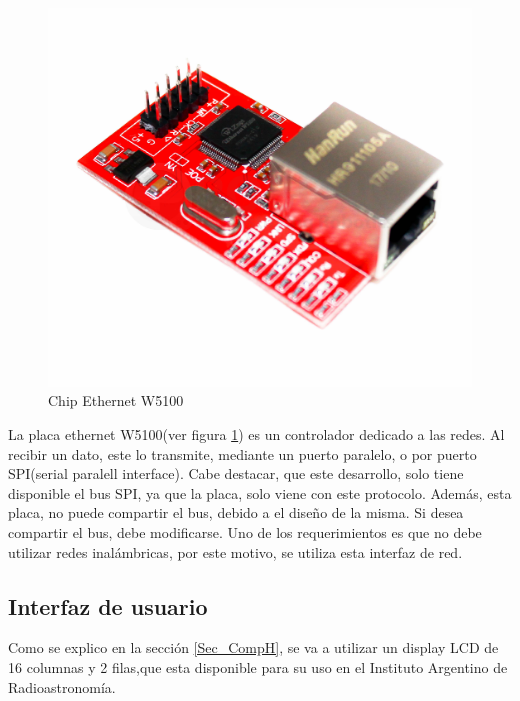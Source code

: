 \begin{figure}[ht]
	\centering	
	\includegraphics[scale=.2]{w5100}  
	\caption{Chip Ethernet W5100}		 
	\label{fig:chip_ethernet}
\end{figure}

La placa ethernet W5100(ver figura \ref{fig:chip_ethernet}) es un controlador dedicado a las redes. Al recibir un dato, este lo transmite, mediante un puerto paralelo, o por puerto SPI(serial paralell interface). Cabe destacar, que este desarrollo, solo tiene disponible el bus SPI, ya que la placa, solo viene con este protocolo. Además, esta placa, no puede compartir el bus, debido a el diseño de la misma. Si desea compartir el bus, debe modificarse. Uno de los requerimientos es que no debe utilizar redes inalámbricas, por este motivo, se utiliza esta interfaz de red. 

\subsection{Interfaz de usuario} \label{Int_u}
Como se explico en la sección \ref{Sec_CompH}, se va a utilizar un display LCD de 16 columnas y 2 filas,que esta disponible para su uso en el Instituto Argentino de Radioastronomía.  
 
